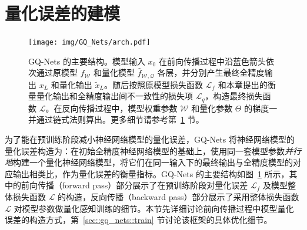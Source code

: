 \documentclass[
  fontset = mac,
]{shtthesis}
\providecommand{\FpNet}{f_{\mathcal{W}}}
\providecommand{\QuantNet}{\hat{f}_{\mathcal{W, Q}}}
\begin{document}
\section{量化误差的建模} \label{sec::gq_nets::q_error}

\begin{figure}[htb]
  \centering
  \texttt{[image: img/GQ\_Nets/arch.pdf]}
  \caption{GQ-Nets 的主要结构。模型输入 $x_0$ 在前向传播过程中沿蓝色箭头依次通过原模型 $\FpNet$ 和量化模型 $\QuantNet$ 各层，并分别产生最终全精度输出 $x_L$ 和量化输出 $\tilde{x}_L$。随后按照原模型损失函数 $\mathcal{L}_f$ 和本章提出的衡量量化输出和全精度输出间不一致性的损失项 $\mathcal{L}_q$，构造最终损失函数 $\mathcal{L}$。在反向传播过程中，模型权重参数 $\mathcal{W}$ 和量化参数 $\Theta$ 的梯度一并通过链式法则算出。更多细节请参考第~\ref{sec::gq_nets::q_error} 节。}
  \label{img::gq_nets::arch}
\end{figure}

为了能在预训练阶段减小神经网络模型的量化误差，GQ-Nets 将神经网络模型的量化误差构造为：在初始全精度神经网络模型的基础上，使用同一套模型参数\emph{并行地}构建一个量化神经网络模型，将它们在同一输入下的最终输出与全精度模型的对应输出相类比，作为量化误差的衡量指标。GQ-Nets 的主要结构如图~\ref{img::gq_nets::arch} 所示，其中的前向传播（forward pass）部分展示了在预训练阶段对量化误差 $\mathcal{L}_f$ 及模型整体损失函数 $\mathcal{L}$ 的构造，反向传播（backward pass）部分展示了采用整体损失函数 $\mathcal{L}$ 对模型参数做量化感知训练的细节。本节先详细讨论前向传播过程中模型量化误差的构造方式，第~\ref{sec::gq_nets::train} 节讨论该框架的具体优化细节。
\end{document}
